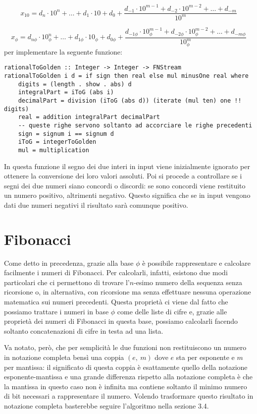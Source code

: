 \documentclass[Lau]{sapthesis}
\begin{document}
$$x_{10} = d_n \cdot 10^n + \ldots + d_1 \cdot 10 + d_0 + \frac{d_{-1} \cdot 10^{m-1} + d_{-2} \cdot 10^{m-2} + \ldots + d_{-m}}{10^m}$$

$$x_\phi = d_{n\phi} \cdot 10_\phi^n + \ldots + d_{1\phi} \cdot 10_\phi + d_{0\phi} + \frac{d_{-1\phi} \cdot 10_\phi^{m-1} + d_{-2\phi} \cdot 10_\phi^{m-2} + \ldots + d_{-m\phi}}{10_\phi^m}$$
per implementare la seguente funzione:
\begin{verbatim}
rationalToGolden :: Integer -> Integer -> FNStream
rationalToGolden i d = if sign then real else mul minusOne real where
    digits = (length . show . abs) d
    integralPart = iToG (abs i)
    decimalPart = division (iToG (abs d)) (iterate (mul ten) one !! digits)
    real = addition integralPart decimalPart
    -- queste righe servono soltanto ad accorciare le righe precedenti
    sign = signum i == signum d
    iToG = integerToGolden
    mul = multiplication
\end{verbatim}
In questa funzione il segno dei due interi in input viene inizialmente ignorato per ottenere la conversione dei loro valori assoluti. Poi si procede a controllare se i segni dei due numeri siano concordi o discordi: se sono concordi viene restituito un numero positivo, altrimenti negativo. Questo significa che se in input vengono dati due numeri negativi il risultato sarà comunque positivo.


\section{Fibonacci}
Come detto in precedenza, grazie alla base $\phi$ è possibile rappresentare e calcolare facilmente i numeri di Fibonacci. Per calcolarli, infatti, esistono due modi particolari che ci permettono di trovare l'$n$-esimo numero della sequenza senza ricorsione o, in alternativa, con ricorsione ma senza effettuare nessuna operazione matematica sui numeri precedenti. Questa proprietà ci viene dal fatto che possiamo trattare i numeri in base $\phi$ come delle liste di cifre e, grazie alle proprietà dei numeri di Fibonacci in questa base, possiamo calcolarli facendo soltanto concatenazioni di cifre in testa ad una lista.

Va notato, però, che per semplicità le due funzioni non restituiscono un numero in notazione completa bensì una coppia $(e, \ m)$ dove $e$ sta per esponente e $m$ per mantissa: il significato di questa coppia è esattamente quello della notazione esponente-mantissa e una grande differenza rispetto alla notazione completa è che la mantissa in questo caso non è infinita ma contiene soltanto il minimo numero di bit necessari a rappresentare il numero. Volendo trasformare questo risultato in notazione completa basterebbe seguire l'algoritmo nella sezione 3.4.
\end{document}
